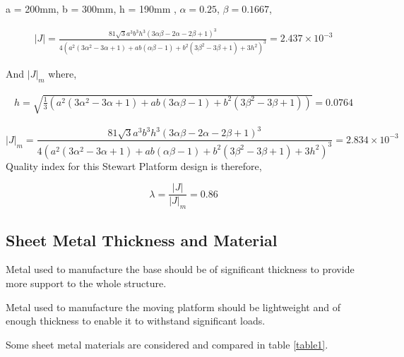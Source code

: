 a = 200mm, b = 300mm, h = 190mm , $\alpha = 0.25$, $ \beta = 0.1667$,
\begin{ceqn}
\begin{align}
	|J| =
	\frac{81 \sqrt{3} a^3 b^3 h^3 (3 \alpha \beta - 2 \alpha - 2 \beta +1)^3}{4(a^2(3 \alpha^2 - 3 \alpha + 1)+ ab(\alpha \beta - 1 )+ b^2(3 \beta^2 - 3 \beta + 1)+ 3h^2)^3} = 2.437 \times 10^{-3}
	\label{eq:myeqn}
\end{align}
\end{ceqn}
And $ |J|_{m}$ where,
\begin{ceqn}
\begin{align}
	h = \sqrt{\frac{1}{3}(a^2 (3 \alpha^2 - 3 \alpha + 1)+ ab (3\alpha\beta - 1)+b^2(3 \beta^2 - 3 \beta + 1))} = 0.0764
	\label{eq:myeqn}
\end{align}
\end{ceqn}
\begin{equation*}
|J|_{m} =
\frac{81 \sqrt{3} a^3 b^3 h^3 (3 \alpha \beta - 2 \alpha - 2 \beta +1)^3}{4(a^2(3 \alpha^2 - 3 \alpha + 1)+ ab(\alpha \beta - 1 )+ b^2(3 \beta^2 - 3 \beta + 1)+ 3h^2)^3} = 2.834 \times 10^{-3}
\label{eq:myeqn}
\end{equation*}
Quality index for this Stewart Platform design is therefore, 

$$\lambda = \frac{|J|}{|J|_{m}} = 0.86$$
\subsection{Sheet Metal Thickness and Material}
Metal used to manufacture the base should be of significant thickness to provide more support to the whole structure.

Metal used to manufacture the moving platform should be lightweight and of enough thickness to enable it to withstand significant loads.

Some sheet metal materials are considered and compared in table \ref{table1}.

